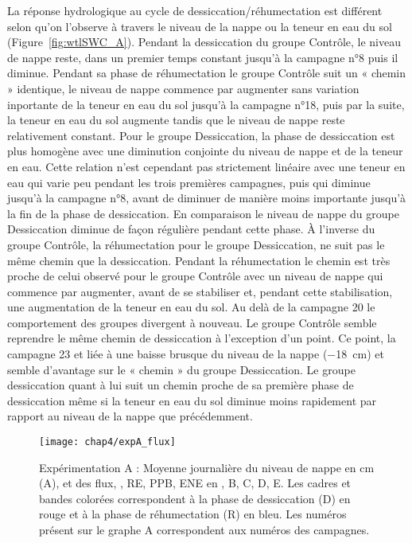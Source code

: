 La réponse hydrologique au cycle de dessiccation/réhumectation est différent selon qu'on l'observe à travers le niveau de la nappe ou la teneur en eau du sol (Figure~\ref{fig:wtlSWC_A}).
Pendant la dessiccation du groupe Contrôle, le niveau de nappe reste, dans un premier temps constant jusqu'à la campagne n°8 puis il diminue. 
Pendant sa phase de réhumectation le groupe Contrôle suit un « chemin » identique, le niveau de nappe commence par augmenter sans variation inportante de la teneur en eau du sol jusqu'à la campagne n°18, puis par la suite, la teneur en eau du sol augmente tandis que le niveau de nappe reste relativement constant.
Pour le groupe Dessiccation, la phase de dessiccation est plus homogène avec une diminution conjointe du niveau de nappe et de la teneur en eau.
Cette relation n'est cependant pas strictement linéaire avec une teneur en eau qui varie peu pendant les trois premières campagnes, puis qui diminue jusqu'à la campagne n°8, avant de diminuer de manière moins importante jusqu'à la fin de la phase de dessiccation.
En comparaison le niveau de nappe du groupe Dessiccation diminue de façon régulière pendant cette phase.
À l'inverse du groupe Contrôle, la réhumectation pour le groupe Dessiccation, ne suit pas le même chemin que la dessiccation.
Pendant la réhumectation le chemin est très proche de celui observé pour le groupe Contrôle avec un niveau de nappe qui commence par augmenter, avant de se stabiliser et, pendant cette stabilisation, une augmentation de la teneur en eau du sol.
Au delà de la campagne 20 le comportement des groupes divergent à nouveau.
Le groupe Contrôle semble reprendre le même chemin de dessiccation à l'exception d'un point.
Ce point, la campagne 23 et liée à une baisse brusque du niveau de la nappe (\SI{-18}{\centi\metre}) et semble d'avantage sur le « chemin » du groupe Dessiccation.
Le groupe dessiccation quant à lui suit un chemin proche de sa première phase de dessiccation même si la teneur en eau du sol diminue moins rapidement par rapport au niveau de la nappe que précédemment.


\begin{figure}
\centering
\texttt{[image: chap4/expA\_flux]}
\caption{Expérimentation A : Moyenne journalière du niveau de nappe en cm (A), et des flux, \chh, RE, PPB, ENE en \si{\uml}, B, C, D, E. Les cadres et bandes colorées correspondent à la phase de dessiccation (D) en rouge et à la phase de réhumectation (R) en bleu. Les numéros présent sur le graphe A correspondent aux numéros des campagnes.}
\label{fig:HMzi}
\end{figure}

